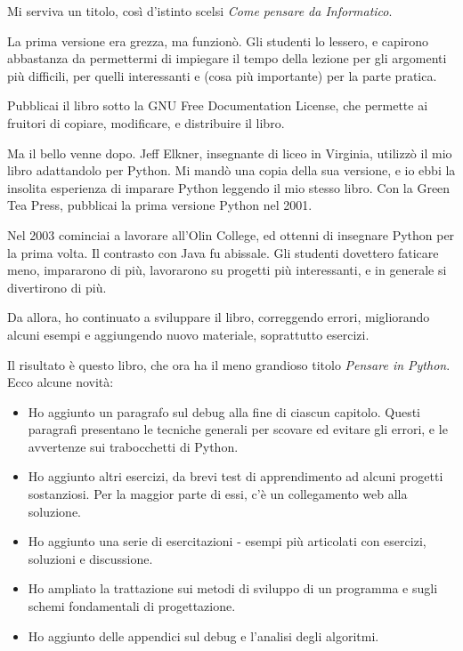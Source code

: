 \documentclass[10pt]{book}
\begin{document}
Mi serviva un titolo, così d'istinto scelsi {\em Come pensare da Informatico}.

La prima versione era grezza, ma funzionò. Gli studenti lo lessero, e capirono abbastanza da permettermi di impiegare il tempo della lezione per gli argomenti più difficili, per quelli interessanti e (cosa più importante) per la parte pratica.

Pubblicai il libro sotto la GNU Free Documentation License, che permette ai fruitori di copiare, modificare, e distribuire il libro.


Ma il bello venne dopo. Jeff Elkner, insegnante di liceo in Virginia, utilizzò il mio libro adattandolo per Python. Mi mandò una copia della sua versione, e io ebbi la insolita esperienza di imparare Python leggendo il mio stesso libro. Con la Green Tea Press, pubblicai la prima versione Python nel 2001.

Nel 2003 cominciai a lavorare all'Olin College, ed ottenni di insegnare Python per la prima volta. Il contrasto con Java fu abissale. Gli studenti dovettero faticare meno, impararono di più, lavorarono su progetti più interessanti, e in generale si divertirono di più.

Da allora, ho continuato a sviluppare il libro, correggendo errori, migliorando alcuni esempi e aggiungendo nuovo materiale, soprattutto esercizi.

Il risultato è questo libro, che ora ha il meno grandioso titolo 
{\em Pensare in Python}.  Ecco alcune novità:

\begin{itemize}

\item Ho aggiunto un paragrafo sul debug alla fine di ciascun capitolo. Questi paragrafi presentano le tecniche generali per scovare ed evitare gli errori, e le avvertenze sui trabocchetti di Python.

\item Ho aggiunto altri esercizi, da brevi test di apprendimento ad alcuni progetti sostanziosi. Per la maggior parte di essi, c'è un collegamento web alla soluzione.

\item Ho aggiunto una serie di esercitazioni - esempi più articolati con esercizi, soluzioni e discussione. 
  
\item Ho ampliato la trattazione sui metodi di sviluppo di un programma e sugli schemi fondamentali di progettazione.

\item Ho aggiunto delle appendici sul debug e l'analisi degli algoritmi.

\end{itemize}
\end{document}
